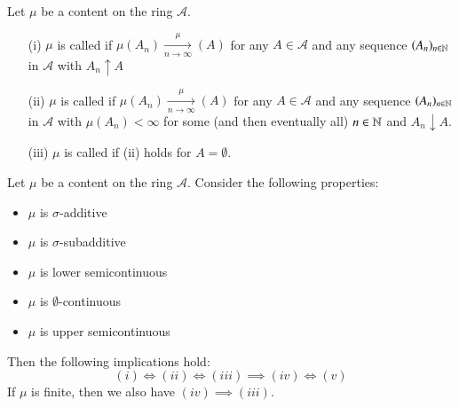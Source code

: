 \documentclass[12pt, a4paper, oneside, openright, titlepage]{book}
\begin{document}
\begin{defn}
    Let $\mu$ be a content on the ring $\mathcal{A}$. \begin{itemize}
        \item[(i)] $\mu$ is called  if $\mu(A_n)\xrightarrow[n\rightarrow \infty]\mu(A)$ for any $A \in \mathcal{A}$ and any sequence $(A_n)_{n\in \mathbb N}$ in $\mathcal{A}$ with $A_n\uparrow A$
        \item[(ii)] $\mu$ is called  if $\mu(A_n)\xrightarrow[n\rightarrow \infty]\mu(A)$ for any $A \in \mathcal{A}$ and any sequence $(A_n)_{n \in \mathbb N}$ in $\mathcal{A}$ with $\mu(A_n) < \infty$ for some (and then eventually all) $n \in \mathbb N$ and $A_n \downarrow A$.
        \item[(iii)] $\mu$ is called  if (ii) holds for $A = \emptyset$.
    \end{itemize}
\end{defn}

\begin{thm}
    Let $\mu$ be a content on the ring $\mathcal{A}$. Consider the following properties: \begin{itemize}
        \item $\mu$ is $\sigma$-additive
        \item $\mu$ is $\sigma$-subadditive
        \item $\mu$ is lower semicontinuous 
        \item $\mu$ is $\emptyset$-continuous 
        \item $\mu$ is upper semicontinuous
    \end{itemize}
    Then the following implications hold: \begin{equation*}
        (i) \iff (ii) \iff (iii) \implies (iv) \iff (v)
    \end{equation*}
    If $\mu$ is finite, then we also have $(iv) \implies (iii)$.
\end{thm}
\end{document}
